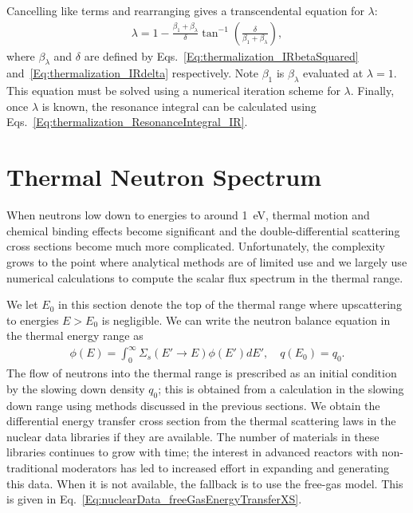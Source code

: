Cancelling like terms and rearranging gives a transcendental equation for $\lambda$:
\begin{align}
  \lambda = 1 - \frac{\beta_1 + \beta_\lambda}{\delta} \tan^{-1} \left( \frac{\delta}{\beta_1 + \beta_\lambda} \right) , \label{Eq:thermalization_IRParameter}
\end{align}
where $\beta_\lambda$ and $\delta$ are defined by Eqs.~\eqref{Eq:thermalization_IRbetaSquared} and~\eqref{Eq:thermalization_IRdelta} respectively. Note $\beta_1$ is $\beta_\lambda$ evaluated at $\lambda = 1$. This equation must be solved using a numerical iteration scheme for $\lambda$. Finally, once $\lambda$ is known, the resonance integral can be calculated using Eqs.~\eqref{Eq:thermalization_ResonanceIntegral_IR}.

\section{Thermal Neutron Spectrum}

When neutrons low down to energies to around 1~eV, thermal motion and chemical binding effects become significant and the double-differential scattering cross sections become much more complicated. Unfortunately, the complexity grows to the point where analytical methods are of limited use and we largely use numerical calculations to compute the scalar flux spectrum in the thermal range. 

We let $E_0$ in this section denote the top of the thermal range where upscattering to energies $E > E_0$ is negligible. We can write the neutron balance equation in the thermal energy range as
\begin{align}
  [ B^2 D(E) + \Sigma_t(E) ] \phi(E) = \int_0^\infty \Sigma_s( E' \rightarrow E ) \phi(E') dE' , \quad q(E_0) = q_0.
\end{align}
The flow of neutrons into the thermal range is prescribed as an initial condition by the slowing down density $q_0$; this is obtained from a calculation in the slowing down range using methods discussed in the previous sections. We obtain the differential energy transfer cross section from the thermal scattering laws in the nuclear data libraries if they are available. The number of materials in these libraries continues to grow with time; the interest in advanced reactors with non-traditional moderators has led to increased effort in expanding and generating this data. When it is not available, the fallback is to use the free-gas model. This is given in Eq.~\eqref{Eq:nuclearData_freeGasEnergyTransferXS}.

